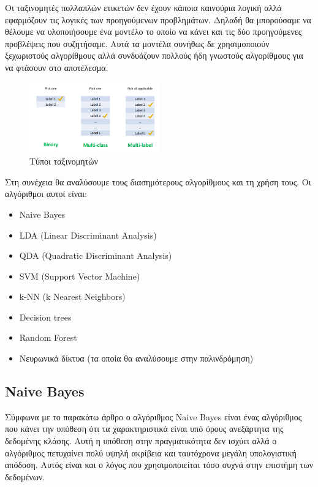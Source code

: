 Οι ταξινομητές πολλαπλών ετικετών δεν έχουν κάποια καινούρια
λογική αλλά εφαρμόζουν τις λογικές των προηγούμενων
προβλημάτων. Δηλαδή θα μπορούσαμε να θέλουμε να υλοποιήσουμε
ένα μοντέλο το οποίο να κάνει και τις δύο προηγούμενες
προβλέψεις που συζητήσαμε. Αυτά τα μοντέλα συνήθως δε
χρησιμοποιούν ξεχωριστούς αλγορίθμους αλλά συνδυάζουν
πολλούς ήδη γνωστούς αλγορίθμους για να φτάσουν στο
αποτέλεσμα.
\begin{figure}[H]
    \centering
    \includegraphics[width=0.5\textwidth]{images/typesOfClassifiers.png}
    \caption{Τύποι ταξινομητών}
\end{figure}

Στη συνέχεια θα αναλύσουμε τους διασημότερους αλγορίθμους
και τη χρήση τους. Οι αλγόριθμοι αυτοί είναι\cite{algo7, algo8, algo82}:
\begin{itemize}
    \item \textlatin{Naive Bayes}
    \item \textlatin{LDA (Linear Discriminant Analysis)}
    \item \textlatin{QDA (Quadratic Discriminant Analysis)}
    \item \textlatin{SVM (Support Vector Machine)}
    \item \textlatin{k-NN (k Nearest Neighbors)}
    \item \textlatin{Decision trees}
    \item \textlatin{Random Forest}
    \item Νευρωνικά δίκτυα (τα οποία θα αναλύσουμε στην παλινδρόμηση)
\end{itemize}

\subsection{\textlatin{Naive Bayes}}
Σύμφωνα με το παρακάτω άρθρο \cite{webb2010naive} ο αλγόριθμος \textlatin{Naive Bayes} είναι
ένας αλγόριθμος που κάνει την υπόθεση ότι τα χαρακτηριστικά είναι υπό όρους ανεξάρτητα της
δεδομένης κλάσης. Αυτή η υπόθεση στην πραγματικότητα δεν ισχύει αλλά ο αλγόριθμος πετυχαίνει
πολύ υψηλή ακρίβεια και ταυτόχρονα μεγάλη υπολογιστική απόδοση. Αυτός είναι και ο λόγος που
χρησιμοποιείται τόσο συχνά στην επιστήμη των δεδομένων.

